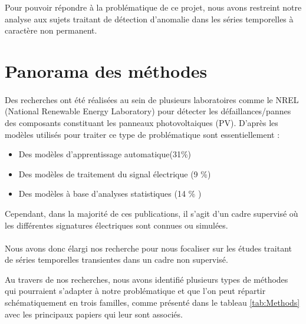 Pour pouvoir répondre à la problématique de ce projet, nous avons restreint notre analyse aux sujets traitant de détection d'anomalie dans les séries temporelles à caractère non permanent.


\section{Panorama des méthodes}
\paragraph{}
Des recherches ont été réalisées au sein de plusieurs laboratoires comme le NREL (National Renewable Energy Laboratory) pour détecter les défaillances/pannes des composants constituant les panneaux photovoltaiques (PV). D'après \cite{FaultSolarPanel} les modèles utilisés pour traiter ce type de problématique sont essentiellement :
\begin{itemize}
    \item Des modèles d'apprentissage automatique(31\%)
    \item Des modèles de traitement du signal électrique (9 \%)
    \item Des modèles à base d'analyses statistiques (14 \% )
\end{itemize}
Cependant, dans la majorité de ces publications, il s'agit d'un cadre supervisé où les différentes signatures électriques sont connues ou simulées.

\paragraph{}
Nous avons donc élargi nos recherche pour nous focaliser sur les études traitant de séries temporelles transientes dans un cadre non supervisé.

Au travers de nos recherches, nous avons identifié plusieurs types de méthodes qui pourraient s'adapter à notre problématique et que l'on peut répartir schématiquement en trois familles, comme présenté dans le tableau \ref{tab:Methods} avec les principaux papiers qui leur sont associés.
